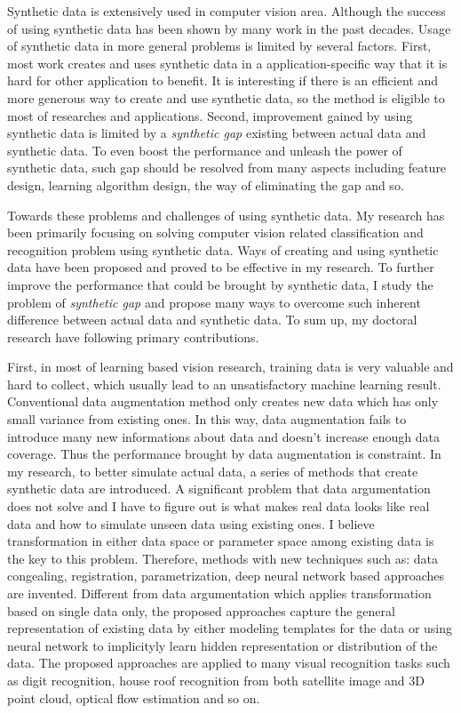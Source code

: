 \documentclass{iitthesis}
\begin{document}
\clearpage

 \label{chapter: conclusion}

Synthetic data is extensively used in computer vision area. Although the success of using synthetic data has been shown by many work in the past decades. Usage of synthetic data in more general problems is limited by several factors. First, most work creates and uses synthetic data in a application-specific way that it is hard for other application to benefit. It is interesting if there is an efficient and more generous way to create and use synthetic data, so the method is eligible to most of researches and applications. Second, improvement gained by using synthetic data is limited by a \textit{synthetic gap} existing between actual data and synthetic data. To even boost the performance and unleash the power of synthetic data, such gap should be resolved from many aspects including feature design, learning algorithm design, the way of eliminating the gap and so.

Towards these problems and challenges of using synthetic data. My research has been primarily focusing on solving computer vision related classification and recognition problem using synthetic data. Ways of creating and using synthetic data have been proposed and proved to be effective in my research. To further improve the performance that could be brought by synthetic data, I study the problem of \textit{synthetic gap} and propose many ways to overcome such inherent difference between actual data and synthetic data. To sum up, my doctoral research have following primary contributions.

First, in most of learning based vision research, training data is very valuable and hard to collect, which usually lead to an unsatisfactory machine learning result. Conventional data augmentation method only creates
new data which has only small variance from existing ones. In this way, data augmentation fails to introduce many new informations about data and doesn't increase enough data coverage. Thus the performance brought by data augmentation is constraint. In my research, to better simulate actual data, a series of methods that create synthetic data are introduced. A significant problem that data argumentation does not solve and I have to figure out is what makes real data looks like real data and how to simulate unseen data using existing ones. I believe transformation in either data space or parameter space among existing data is the key to this problem. Therefore, methods with new techniques such as: data congealing, registration, parametrization, deep neural network based approaches
are invented. Different from data argumentation which applies transformation based on single data only, the proposed approaches capture the general representation of existing data by either modeling templates for the data or using neural network to implicityly learn hidden representation or distribution of the data. The proposed approaches are applied to many visual recognition tasks such as digit recognition, house roof recognition from both satellite image and 3D point cloud, optical flow estimation and so on.
\end{document}
